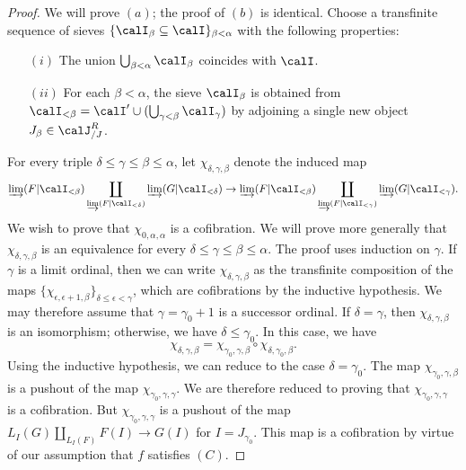 \begin{proof}
We will prove $(a)$; the proof of $(b)$ is identical. Choose a transfinite sequence of sieves
$\{ \calI_{\beta} \subseteq \calI \}_{ \beta < \alpha }$ with the following properties:
\begin{itemize}
\item[$(i)$] The union $\bigcup_{\beta < \alpha} \calI_{\beta}$ coincides with $\calI$.
\item[$(ii)$] For each $\beta < \alpha$, the sieve $\calI_{\beta}$ is obtained
from $\calI_{< \beta} = \calI' \cup (\bigcup_{ \gamma < \beta} \calI_{\gamma})$
by adjoining a single new object $J_{\beta} \in \calJ^{R}_{/J}$. 
\end{itemize}
For every triple $\delta \leq \gamma \leq \beta \leq \alpha$, let
$\chi_{ \delta, \gamma, \beta}$ denote the induced map
$$ \varinjlim( F| \calI_{< \beta}) \coprod_{ \varinjlim(F | \calI_{< \delta})}
\varinjlim( G| \calI_{< \delta}) \rightarrow
\varinjlim( F | \calI_{< \beta} ) \coprod_{ \varinjlim( F| \calI_{< \gamma}) }
\varinjlim( G| \calI_{< \gamma} ).$$
We wish to prove that $\chi_{0, \alpha, \alpha}$ is a cofibration.
We will prove more generally that $\chi_{\delta, \gamma, \beta}$ is an
equivalence for every $\delta \leq \gamma \leq \beta \leq \alpha$.
The proof uses induction on $\gamma$. If $\gamma$ is a limit ordinal, 
then we can write $\chi_{\delta, \gamma, \beta}$ as the transfinite composition
of the maps $\{ \chi_{ \epsilon, \epsilon + 1, \beta} \}_{\delta \leq \epsilon < \gamma}$, which are cofibrations by the inductive hypothesis. We may therefore assume that
$\gamma = \gamma_0 + 1$ is a successor ordinal. If $\delta = \gamma$, then
$\chi_{\delta, \gamma, \beta}$ is an isomorphism; otherwise, we have
$\delta \leq \gamma_0$. In this case, we have
$$ \chi_{ \delta, \gamma, \beta} = \chi_{ \gamma_0, \gamma, \beta} \circ \chi_{ \delta, \gamma_0, \beta}.$$
Using the inductive hypothesis, we can reduce to the case $\delta = \gamma_0$. The map
$\chi_{\gamma_0, \gamma, \beta}$ is a pushout of the map $\chi_{\gamma_0, \gamma, \gamma}$. We are therefore reduced to proving that $\chi_{\gamma_0, \gamma, \gamma}$
is a cofibration. But $\chi_{\gamma_0, \gamma, \gamma}$ is a pushout of the map
$L_{I}(G) \coprod_{ L_{I}(F)} F(I) \rightarrow G(I)$ for $I = J_{\gamma_0}$.
This map is a cofibration by virtue of our assumption that $f$ satisfies $(C)$.
\end{proof}

